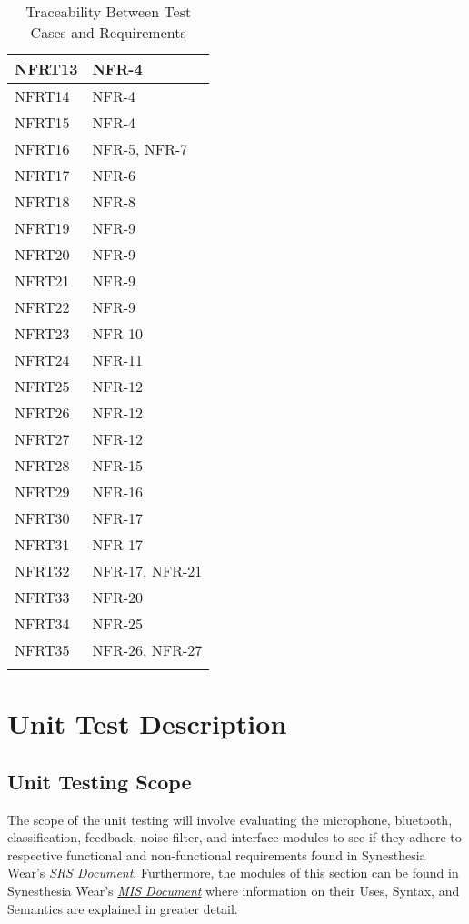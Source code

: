 \documentclass[12pt, titlepage]{article}
\begin{document}
\begin{longtable}{| p{} | p{} |}
  NFRT13 &  NFR-4  \\ \hline
  NFRT14 &  NFR-4  \\ \hline
  NFRT15 &  NFR-4  \\ \hline
  NFRT16 &  NFR-5, NFR-7  \\ \hline
  NFRT17 &  NFR-6  \\ \hline
  NFRT18 &  NFR-8  \\ \hline
  NFRT19 &   NFR-9 \\ \hline
  NFRT20 &  NFR-9  \\ \hline
  NFRT21 &  NFR-9  \\ \hline
  NFRT22&  NFR-9  \\ \hline
  NFRT23 &  NFR-10  \\ \hline
  NFRT24 &  NFR-11  \\ \hline
  NFRT25 &  NFR-12  \\ \hline
  NFRT26 &  NFR-12  \\ \hline
  NFRT27 &  NFR-12  \\ \hline
  NFRT28 &  NFR-15 \\ \hline
  NFRT29 &   NFR-16 \\ \hline
  NFRT30 &  NFR-17  \\ \hline
  NFRT31 &   NFR-17 \\ \hline
  NFRT32 &  NFR-17, NFR-21 \\ \hline
  NFRT33 &  NFR-20  \\ \hline
  NFRT34 &  NFR-25  \\ \hline
  NFRT35 &   NFR-26, NFR-27 \\ \hline
  \caption{Traceability Between Test Cases and Requirements} %
  \label{tab:myfirstlongtable}
  \end{longtable}
\section{Unit Test Description}

\subsection{Unit Testing Scope}
The scope of the unit testing will involve evaluating the microphone, bluetooth, 
classification, feedback, noise filter, and interface modules to see if they adhere 
to respective functional and non-functional requirements found in Synesthesia Wear’s 
\href{https://github.com/jordanbierbrier/capstone/blob/main/docs/SRS/SRS.pdf}{\textit{SRS Document}}.
Furthermore, the modules of this section can be found in Synesthesia Wear's 
\href{https://github.com/jordanbierbrier/capstone/blob/main/docs/Design/SoftDetailedDes/MIS.pdf}{\textit{MIS Document}}
where information on their Uses, Syntax, and Semantics are explained in greater detail.
\end{document}
